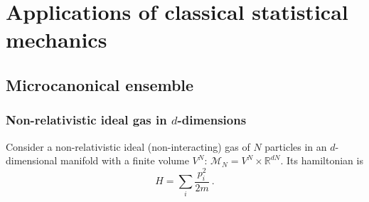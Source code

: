\part{Applications of classical statistical mechanics}

\chapter{Microcanonical ensemble}

\section{Non-relativistic ideal gas in $d$-dimensions}

    Consider a non-relativistic ideal (non-interacting) gas of $N$ particles in an $d$-dimensional manifold with a finite volume $V^N$: $\mathcal M_N = V^N \times \mathbb R^{dN}$. Its hamiltonian is 
    \begin{equation*}
        H = \sum_i \frac{p^2_i}{2m} ~.
    \end{equation*}

